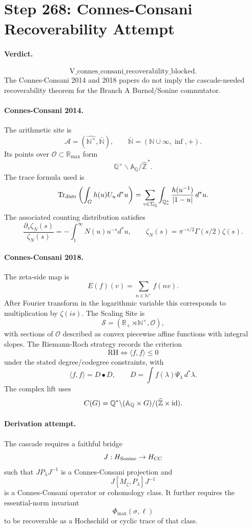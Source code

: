 \section*{Step 268: Connes-Consani Recoverability Attempt}

\paragraph{Verdict.}
\[
\mathrm{V\_connes\_consani\_recoverability\_blocked}.
\]
The Connes-Consani 2014 and 2018 papers do not imply the cascade-needed
recoverability theorem for the Branch A Burnol/Sonine commutator.

\paragraph{Connes-Consani 2014.}
The arithmetic site is
\[
\mathcal A=(\widehat{\mathbb N^\times},\bar{\mathbb N}),
\qquad
\bar{\mathbb N}=(\mathbb N\cup\infty,\inf,+).
\]
Its points over \(\mathcal O\subset\mathbb R_{\max}\) form
\[
\mathbb Q^\times\backslash \mathbb A_\mathbb Q/\widehat{\mathbb Z}^{\,*}.
\]
The trace formula used is
\[
\operatorname{Tr}_{\rm distr}\left(\int_G h(u)U_u\,d^*u\right)
=\sum_{v\in\Sigma_\mathbb Q}\int_{\mathbb Q_v^*}
\frac{h(u^{-1})}{|1-u|}\,d^*u.
\]
The associated counting distribution satisfies
\[
\frac{\partial_s\zeta_N(s)}{\zeta_N(s)}
=-\int_1^\infty N(u)u^{-s}d^*u,
\qquad
\zeta_N(s)=\pi^{-s/2}\Gamma(s/2)\zeta(s).
\]

\paragraph{Connes-Consani 2018.}
The zeta-side map is
\[
E(f)(v)=\sum_{n\in\mathbb N^\times}f(nv).
\]
After Fourier transform in the logarithmic variable this corresponds to
multiplication by \(\zeta(is)\).  The Scaling Site is
\[
\mathcal S=(\mathbb R_+\rtimes\mathbb N^\times,\mathcal O),
\]
with sections of \(\mathcal O\) described as convex piecewise affine functions
with integral slopes.  The Riemann-Roch strategy records the criterion
\[
\mathrm{RH}\Longleftrightarrow \langle f,f\rangle\leq0
\]
under the stated degree/codegree constraints, with
\[
\langle f,f\rangle=D\bullet D,
\qquad
D=\int f(\lambda)\Psi_\lambda\,d^*\lambda.
\]
The complex lift uses
\[
C(G)=\mathbb Q^*\backslash(\mathbb A_\mathbb Q\times G)/
(\widehat{\mathbb Z}\times{\rm id}).
\]

\paragraph{Derivation attempt.}
The cascade requires a faithful bridge
\[
J:H_{\rm Sonine}\to H_{\rm CC}
\]
such that \(J P_\lambda J^{-1}\) is a Connes-Consani projection and
\[
J[M_\zeta,P_\lambda]J^{-1}
\]
is a Connes-Consani operator or cohomology class.  It further requires the
essential-norm invariant
\[
\Phi_{\max}(\sigma,\ell)
\]
to be recoverable as a Hochschild or cyclic trace of that class.


